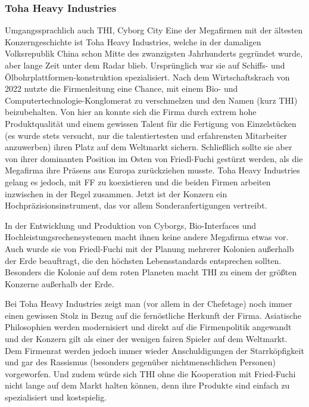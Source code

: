 \subsubsection{Toha Heavy Industries}
Umgangssprachlich auch \glqq THI\grqq{}, \glqq Cyborg City\grqq{}
Eine der Megafirmen mit der ältesten Konzerngeschichte ist Toha Heavy Industries, welche in der damaligen Volksrepublik China schon Mitte des zwanzigsten Jahrhunderts gegründet wurde, aber lange Zeit unter dem Radar blieb. Ursprünglich war sie auf Schiffs- und Ölbohrplattformen-konstruktion spezialisiert. Nach dem Wirtschaftskrach von 2022 nutzte die Firmenleitung eine Chance, mit einem Bio- und Computertechnologie-Konglomerat zu verschmelzen und den Namen (kurz THI) beizubehalten. Von hier an konnte sich die Firma durch extrem hohe Produktqualität und einem gewissen Talent für die Fertigung von Einzelstücken (es wurde stets versucht, nur die talentiertesten und erfahrensten Mitarbeiter anzuwerben) ihren Platz auf dem Weltmarkt sichern. Schließlich sollte sie aber von ihrer dominanten Position im Osten von Friedl-Fuchi gestürzt werden, als die Megafirma ihre Präsens aus Europa zurückziehen musste. Toha Heavy Industries gelang es jedoch, mit FF zu koexistieren und die beiden Firmen arbeiten inzwischen in der Regel zusammen. Jetzt ist der Konzern ein Hochpräzisionsinstrument, das vor allem Sonderanfertigungen vertreibt.

In der Entwicklung und Produktion von Cyborgs, Bio-Interfaces und Hochleistungsrechensystemen macht ihnen keine andere Megafirma etwas vor. Auch wurde sie von Friedl-Fuchi mit der Planung mehrerer Kolonien außerhalb der Erde beauftragt, die den höchsten Lebensstandards entsprechen sollten. Besonders die Kolonie auf dem roten Planeten macht THI zu einem der größten Konzerne außerhalb der Erde.

Bei Toha Heavy Industries zeigt man (vor allem in der Chefetage) noch immer einen gewissen Stolz in Bezug auf die fernöstliche Herkunft der Firma. Asiatische Philosophien werden \glqq modernisiert\grqq{} und direkt auf die Firmenpolitik angewandt und der Konzern gilt als einer der wenigen \glqq fairen\grqq{} Spieler auf dem Weltmarkt. Dem Firmenrat werden jedoch immer wieder Anschuldigungen der Starrköpfigkeit und gar des Rassismus (besonders gegenüber nichtmenschlichen Personen) vorgeworfen. Und zudem würde sich THI ohne die Kooperation mit Fried-Fuchi nicht lange auf dem Markt halten können, denn ihre Produkte sind einfach zu spezialisiert und kostspielig.
